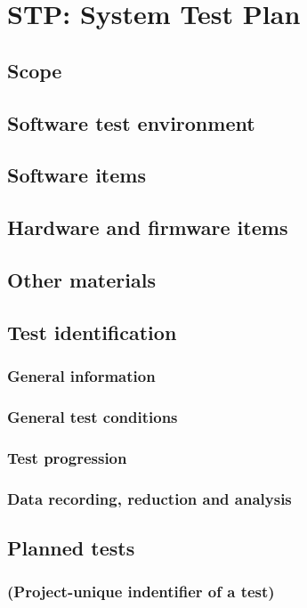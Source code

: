 \section{STP: System Test Plan}

\subsection{Scope}

\subsection{Software test environment}

\subsection{Software items}

\subsection{Hardware and firmware items}

\subsection{Other materials}

\subsection{Test identification}

\subsubsection{General information}

\subsubsection{General test conditions}

\subsubsection{Test progression}

\subsubsection{Data recording, reduction and analysis}

\subsection{Planned tests}

\subsubsection{(Project-unique indentifier of a test)}
